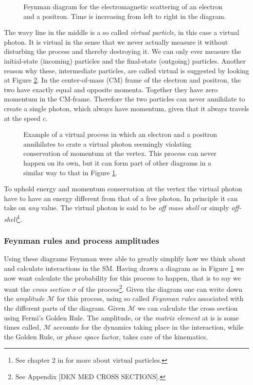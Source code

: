 \begin{figure}[htp]
\centering
	
\caption{Feynman diagram for the electromagnetic scattering of an electron and a positron. Time is increasing from left to right in the diagram.} \label{fig:feyn:ee_a_ee}
\end{figure}

The wavy line in the middle is a so called \emph{virtual particle}, in this case a virtual photon. It is virtual in the sense that we never actually measure it without disturbing the process and thereby destroying it. We can only ever measure the initial-state (incoming) particles and the final-state (outgoing) particles. Another reason why these, intermediate particles, are called virtual is suggested by looking at Figure \ref{fig:feyn:ee_a}. In the center-of-mass (CM) frame of the electron and positron, the two have exactly equal and opposite momenta. Together they have zero momentum in the CM-frame. Therefore the two particles can never annihilate to create a single photon, which always have momentum, given that it always travels at the speed $c$.

\begin{figure}[htp]
\centering
	
\caption{Example of a virtual process in which an electron and a positron annihilates to crate a virtual photon seemingly violating conservation of momentum at the vertex. This process can never happen on its own, but it can form part of other diagrams in a similar way to that in Figure \ref{fig:feyn:ee_a_ee}.} \label{fig:feyn:ee_a}
\end{figure}

To uphold energy and momentum conservation at the vertex the virtual photon have to have an energy different from that of a free photon. In principle it can take on \emph{any} value. The virtual photon is said to be \emph{off mass shell} or simply \emph{off-shell}\footnote{See chapter 2 in \cite{griffiths1987iep} for more about virtual particles.}.

\subsubsection{Feynman rules and process amplitudes}
Using these diagrams Feynman were able to greatly simplify how we think about and calculate interactions in the SM. Having drawn a diagram as in Figure \ref{fig:feyn:ee_a_ee} we now want calculate the probability for this process to happen, that is to say we want the \emph{cross section} $\sigma$ of the process\footnote{See Appendix [DEN MED CROSS SECTIONS].}. Given the diagram one can write down the \emph{amplitude} $\mathcal{M}$ for this process, using so called \emph{Feynman rules} associated with the different parts of the diagram. Given $\mathcal{M}$ we can calculate the cross section using Fermi's Golden Rule. The amplitude, or the \emph{matrix element} at is is some times called, $\mathcal{M}$ accounts for the dynamics taking place in the interaction, while the Golden Rule, or \emph{phase space} factor, takes care of the kinematics.


